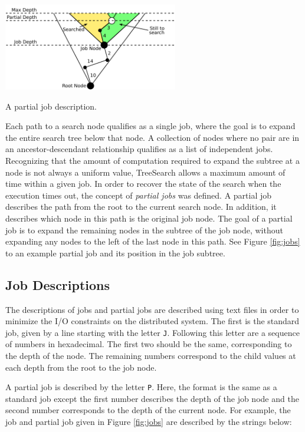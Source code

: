 \documentclass[11pt]{article}
\def\TreeSearch{{TreeSearch}}
\begin{document}
\begin{floatingfigure}{3in}\centering
	\includegraphics[width=3in]{figures/Jobs}
	\caption{\label{fig:jobs}A partial job description.}
\end{floatingfigure}


Each path to a search node qualifies as a single job, where the goal 
	is to expand the entire search tree below that node.
A collection of nodes where no pair are in an ancestor-descendant relationship 
	qualifies as a list of independent jobs.
Recognizing that the amount of computation required to expand 
	the subtree at a node is not always a uniform value,
	{\TreeSearch} allows a maximum amount of time 
	within a given job.
In order to recover the state of the search when the execution times out,
	the concept of \emph{partial jobs} was defined.
A partial job describes the path from the root to the current search node.
In addition, it describes which node in this path is the original job node.
The goal of a partial job is to expand the remaining nodes in the
	subtree of the job node, without expanding any nodes to 
	the left of the last  node in this path.
See Figure \ref{fig:jobs} to an example partial job and its position in the
	job subtree.

\subsection{Job Descriptions}


The descriptions of jobs and partial jobs are described using text files
	in order to minimize the I/O constraints on the distributed system.
The first is the standard job, given by a line starting with the letter \texttt{J}.
Following this letter are a sequence of numbers in hexadecimal.
The first two should be the same, corresponding to the depth of the node.
The remaining numbers correspond to the child values at each depth from the root to the job node.

A partial job is described by the letter \texttt{P}.
Here, the format is the same as a standard job except the first number describes the depth of the job node
	and the second number corresponds to 
	the depth of the current node.
For example, the job and partial job given in Figure \ref{fig:jobs} are described by the strings below:
\end{document}
